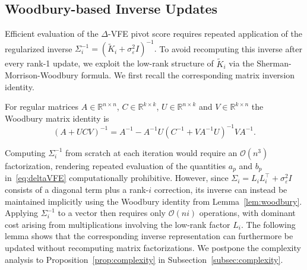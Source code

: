 \documentclass[onefignum,onetabnum]{siamart250211}
\newcommand{\R}{\mathbb{R}}
\begin{document}
\subsection{Woodbury-based Inverse Updates}
Efficient evaluation of the $\Delta$-VFE pivot score requires repeated application of the regularized inverse $\Sigma_i^{-1} = (\widetilde K_i + \sigma_\varepsilon^2 I)^{-1}.$ To avoid recomputing this inverse after every rank-1 update, we exploit the low-rank structure of $\widetilde K_i$ via the Sherman-Morrison-Woodbury formula. We first recall the corresponding matrix inversion identity.
\begin{lemma}\label{lem:woodbury}
For regular matrices $A\in \R^{n\times n}$, $C \in \R^{k\times k}$, $U\in \R^{n \times k}$ and $V\in \R^{k\times n}$ the Woodbury matrix identity is
\begin{equation*}
    (A + UCV)^{-1} = A^{-1} - A^{-1}U (C^{-1} + VA^{-1}U)^{-1}VA^{-1}.
\end{equation*}   
\end{lemma}

Computing $\Sigma_i^{-1}$ from scratch at each iteration would require an $\mathcal{O}(n^3)$ factorization, rendering repeated evaluation of the quantities $a_p$ and $b_p$ in~\eqref{eq:deltaVFE} computationally prohibitive. However, since $\Sigma_i = L_iL_i^\top + \sigma_\varepsilon^2 I$ consists of a diagonal term plus a rank-$i$ correction, its inverse can instead be maintained implicitly using the Woodbury identity from Lemma~\ref{lem:woodbury}. Applying $\Sigma_i^{-1}$ to a vector then requires only $\mathcal{O}(ni)$ operations, with dominant cost arising from multiplications involving the low-rank factor $L_i$.
The following lemma shows that the corresponding inverse representation can furthermore be updated without recomputing matrix factorizations. We postpone the complexity analysis to Proposition~\ref{prop:complexity} in Subsection~\ref{subsec:complexity}.
\end{document}
